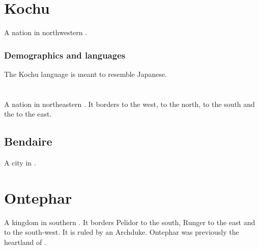 \section{Kochu}
A  nation in northwestern . 





\subsubsection{Demographics and languages}
The Kochu language is meant to resemble Japanese. 
















\section{\Marcil}
\index{\Marcil}
A nation in northeastern \Velcad{}. 
It borders  to the west,  to the north,  to the south and the  to the east. 









\subsection{Bendaire}
A city in \Marcil. 
















\section{Ontephar}
A kingdom in southern \Velcad{}. 
It borders Pelidor to the south, Runger to the east and  to the south-west. 
It is ruled by an Archduke. 
Ontephar was previously the heartland of . 

